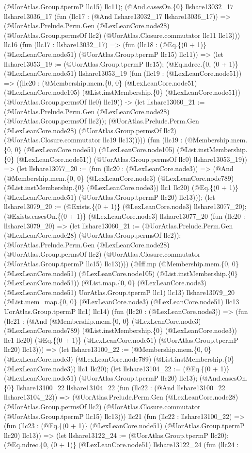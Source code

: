 \documentclass[11pt]{article}
\begin{document}
(@UorAtlas.Group.tpermP llc15) llc11); (@And.casesOn.\{0\} llshare13032\_17 llshare13036\_17 (fun (llc17 : (@And llshare13032\_17 llshare13036\_17)) => (@UorAtlas.Prelude.Perm.Gen (@LexLeanCore.node28) (@UorAtlas.Group.permsOf llc2) (@UorAtlas.Closure.commutator llc11 llc13))) llc16 (fun (llc17 : llshare13032\_17) => (fun (llc18 : (@Eq.\{(0 + 1)\} (@LexLeanCore.node51) (@UorAtlas.Group.tpermP llc15) llc11)) => (let llshare13053\_19 := (@UorAtlas.Group.tpermP llc15); (@Eq.ndrec.\{0, (0 + 1)\} (@LexLeanCore.node51) llshare13053\_19 (fun (llc19 : (@LexLeanCore.node51)) => ((llc20 : (@Membership.mem.\{0, 0\} (@LexLeanCore.node51) (@LexLeanCore.node105) (@List.instMembership.\{0\} (@LexLeanCore.node51)) (@UorAtlas.Group.permsOf llc0) llc19)) -> (let llshare13060\_21 := (@UorAtlas.Prelude.Perm.Gen (@LexLeanCore.node28) (@UorAtlas.Group.permsOf llc2)); (@UorAtlas.Prelude.Perm.Gen (@LexLeanCore.node28) (@UorAtlas.Group.permsOf llc2) (@UorAtlas.Closure.commutator llc19 llc13))))) (fun (llc19 : (@Membership.mem.\{0, 0\} (@LexLeanCore.node51) (@LexLeanCore.node105) (@List.instMembership.\{0\} (@LexLeanCore.node51)) (@UorAtlas.Group.permsOf llc0) llshare13053\_19)) => (let llshare13077\_20 := (fun (llc20 : (@LexLeanCore.node3)) => (@And (@Membership.mem.\{0, 0\} (@LexLeanCore.node3) (@LexLeanCore.node789) (@List.instMembership.\{0\} (@LexLeanCore.node3)) llc1 llc20) (@Eq.\{(0 + 1)\} (@LexLeanCore.node51) (@UorAtlas.Group.tpermP llc20) llc13))); (let llshare13079\_20 := (@Exists.\{(0 + 1)\} (@LexLeanCore.node3) llshare13077\_20); (@Exists.casesOn.\{(0 + 1)\} (@LexLeanCore.node3) llshare13077\_20 (fun (llc20 : llshare13079\_20) => (let llshare13060\_21 := (@UorAtlas.Prelude.Perm.Gen (@LexLeanCore.node28) (@UorAtlas.Group.permsOf llc2)); (@UorAtlas.Prelude.Perm.Gen (@LexLeanCore.node28) (@UorAtlas.Group.permsOf llc2) (@UorAtlas.Closure.commutator (@UorAtlas.Group.tpermP llc15) llc13)))) (@Iff.mp (@Membership.mem.\{0, 0\} (@LexLeanCore.node51) (@LexLeanCore.node105) (@List.instMembership.\{0\} (@LexLeanCore.node51)) (@List.map.\{0, 0\} (@LexLeanCore.node3) (@LexLeanCore.node51) UorAtlas.Group.tpermP llc1) llc13) llshare13079\_20 (@List.mem\_map.\{0, 0\} (@LexLeanCore.node3) (@LexLeanCore.node51) llc13 UorAtlas.Group.tpermP llc1) llc14) (fun (llc20 : (@LexLeanCore.node3)) => (fun (llc21 : (@And (@Membership.mem.\{0, 0\} (@LexLeanCore.node3) (@LexLeanCore.node789) (@List.instMembership.\{0\} (@LexLeanCore.node3)) llc1 llc20) (@Eq.\{(0 + 1)\} (@LexLeanCore.node51) (@UorAtlas.Group.tpermP llc20) llc13))) => (let llshare13100\_22 := (@Membership.mem.\{0, 0\} (@LexLeanCore.node3) (@LexLeanCore.node789) (@List.instMembership.\{0\} (@LexLeanCore.node3)) llc1 llc20); (let llshare13104\_22 := (@Eq.\{(0 + 1)\} (@LexLeanCore.node51) (@UorAtlas.Group.tpermP llc20) llc13); (@And.casesOn.\{0\} llshare13100\_22 llshare13104\_22 (fun (llc22 : (@And llshare13100\_22 llshare13104\_22)) => (@UorAtlas.Prelude.Perm.Gen (@LexLeanCore.node28) (@UorAtlas.Group.permsOf llc2) (@UorAtlas.Closure.commutator (@UorAtlas.Group.tpermP llc15) llc13))) llc21 (fun (llc22 : llshare13100\_22) => (fun (llc23 : (@Eq.\{(0 + 1)\} (@LexLeanCore.node51) (@UorAtlas.Group.tpermP llc20) llc13)) => (let llshare13122\_24 := (@UorAtlas.Group.tpermP llc20); (@Eq.ndrec.\{0, (0 + 1)\} (@LexLeanCore.node51) llshare13122\_24 (fun (llc24 : 
\end{document}
